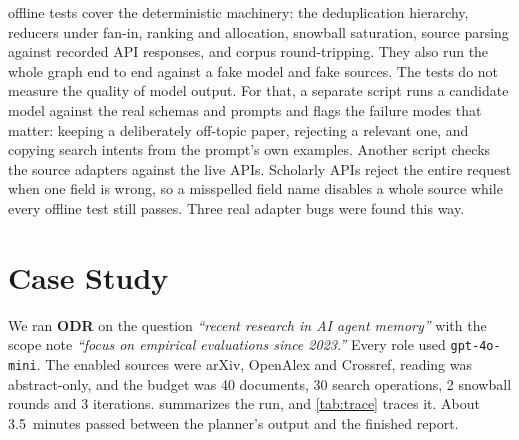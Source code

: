 \documentclass[10pt,a4paper]{article}
\newcommand{\hfont}{\sffamily}
\renewcommand{\paragraph}[1]{%
  \par\vspace{0.35em}{\hfont\bfseries\color{accent}#1}\hspace{0.6em}\ignorespaces}
\newcommand{\code}[1]{\texttt{#1}}
\newcommand{\sys}{{\hfont\bfseries ODR}}
\begin{document}
\paragraph{Testing.} 284 offline tests cover the deterministic machinery:
the deduplication hierarchy, reducers under fan-in, ranking and allocation,
snowball saturation, source parsing against recorded API responses, and
corpus round-tripping. They also run the whole graph end to end against a
fake model and fake sources. The tests do not measure the quality of model
output. For that, a separate script runs a candidate model against the
real schemas and prompts and flags the failure modes that matter: keeping
a deliberately off-topic paper, rejecting a relevant one, and copying
search intents from the prompt's own examples. Another script checks the
source adapters against the live APIs. Scholarly APIs reject the entire
request when one field is wrong, so a misspelled field name disables a
whole source while every offline test still passes. Three real adapter
bugs were found this way.

\section{Case Study}
\label{sec:case}

We ran \sys{} on the question \emph{``recent research in AI agent memory''}
with the scope note \emph{``focus on empirical evaluations since 2023.''}
Every role used \code{gpt-4o-mini}. The enabled sources were arXiv,
OpenAlex and Crossref, reading was abstract-only, and the budget was 40
documents, 30 search operations, 2 snowball rounds and 3 iterations.
 summarizes the run, and \cref{tab:trace} traces it. About
3.5~minutes passed between the planner's output and the finished report.
\end{document}
